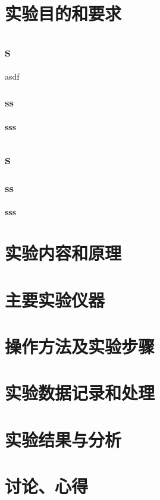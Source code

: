 \documentclass[UTF-8,AutoFakeBold]{article}%
\newcommand{\subsubsubsection}{\paragraph}
\begin{document}
\section{实验目的和要求}
\subsection{s}
asdf
\subsubsection{ss}
\subsubsubsection{sss}
\subsection*{s}
\subsubsection*{ss}
\subsubsubsection*{sss}
\section{实验内容和原理}

\section{主要实验仪器}

\section{操作方法及实验步骤}

\section{实验数据记录和处理}

\section{实验结果与分析}

\section{讨论、心得}
\end{document}

